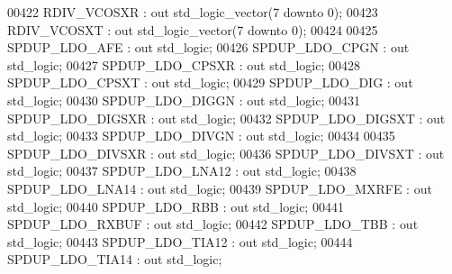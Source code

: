 \begin{DoxyCode}
00422         RDIV\_VCOSXR     : \textcolor{keywordflow}{out} \textcolor{comment}{std\_logic\_vector}(\textcolor{vhdllogic}{}\textcolor{vhdllogic}{7} \textcolor{keywordflow}{downto} \textcolor{vhdllogic}{}\textcolor{vhdllogic}{0});
00423         RDIV\_VCOSXT     : \textcolor{keywordflow}{out} \textcolor{comment}{std\_logic\_vector}(\textcolor{vhdllogic}{}\textcolor{vhdllogic}{7} \textcolor{keywordflow}{downto} \textcolor{vhdllogic}{}\textcolor{vhdllogic}{0});
00424 
00425         SPDUP\_LDO\_AFE                       : \textcolor{keywordflow}{out} \textcolor{comment}{std\_logic};
00426         SPDUP\_LDO\_CPGN                  : \textcolor{keywordflow}{out} \textcolor{comment}{std\_logic};
00427         SPDUP\_LDO\_CPSXR                 : \textcolor{keywordflow}{out} \textcolor{comment}{std\_logic};
00428         SPDUP\_LDO\_CPSXT                 : \textcolor{keywordflow}{out} \textcolor{comment}{std\_logic};
00429         SPDUP\_LDO\_DIG                       : \textcolor{keywordflow}{out} \textcolor{comment}{std\_logic};
00430         SPDUP\_LDO\_DIGGN                 : \textcolor{keywordflow}{out} \textcolor{comment}{std\_logic};
00431         SPDUP\_LDO\_DIGSXR                : \textcolor{keywordflow}{out} \textcolor{comment}{std\_logic};
00432         SPDUP\_LDO\_DIGSXT                : \textcolor{keywordflow}{out} \textcolor{comment}{std\_logic};
00433         SPDUP\_LDO\_DIVGN                 : \textcolor{keywordflow}{out} \textcolor{comment}{std\_logic};
00434 
00435         SPDUP\_LDO\_DIVSXR                : \textcolor{keywordflow}{out} \textcolor{comment}{std\_logic};
00436         SPDUP\_LDO\_DIVSXT                : \textcolor{keywordflow}{out} \textcolor{comment}{std\_logic};
00437         SPDUP\_LDO\_LNA12                 : \textcolor{keywordflow}{out} \textcolor{comment}{std\_logic};
00438         SPDUP\_LDO\_LNA14                 : \textcolor{keywordflow}{out} \textcolor{comment}{std\_logic};
00439         SPDUP\_LDO\_MXRFE                 : \textcolor{keywordflow}{out} \textcolor{comment}{std\_logic};
00440         SPDUP\_LDO\_RBB                       : \textcolor{keywordflow}{out} \textcolor{comment}{std\_logic};
00441         SPDUP\_LDO\_RXBUF                 : \textcolor{keywordflow}{out} \textcolor{comment}{std\_logic};
00442         SPDUP\_LDO\_TBB                       : \textcolor{keywordflow}{out} \textcolor{comment}{std\_logic};
00443         SPDUP\_LDO\_TIA12                 : \textcolor{keywordflow}{out} \textcolor{comment}{std\_logic};
00444         SPDUP\_LDO\_TIA14                 : \textcolor{keywordflow}{out} \textcolor{comment}{std\_logic};

\end{DoxyCode}
